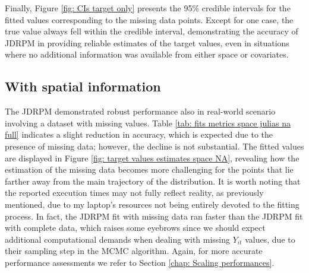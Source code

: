 \documentclass[12pt,	%
	a4paper,		%
	twoside,		%
	openright,		%
	titlepage,%
	]{book}
\theoremstyle{definition}
\begin{document}
Finally, Figure \ref{fig: CIs target only} presents the 95\% credible intervals for the fitted values corresponding to the missing data points. Except for one case, the true value always fell within the credible interval, demonstrating the accuracy of JDRPM in providing reliable estimates of the target values, even in situations where no additional information was available from either space or covariates.


\subsection{With spatial information}
\label{With spatial information}

The JDRPM demonstrated robust performance also in real-world scenario involving a dataset with missing values. Table \ref{tab: fits metrics space julias na full} indicates a slight reduction in accuracy, which is expected due to the presence of missing data; however, the decline is not substantial. The fitted values are displayed in Figure \ref{fig: target values estimates space NA}, revealing how the estimation of the missing data becomes more challenging for the points that lie farther away from the main trajectory of the distribution. It is worth noting that the reported execution times may not fully reflect reality, as previously mentioned, due to my laptop’s resources not being entirely devoted to the fitting process. In fact, the JDRPM fit with missing data ran faster than the JDRPM fit with complete data, which raises some eyebrows since we should expect additional computational demands when dealing with missing $Y_{it}$ values, due to their sampling step in the MCMC algorithm. Again, for more accurate performance assessments we refer to Section \ref{chap: Scaling performances}.
\end{document}
